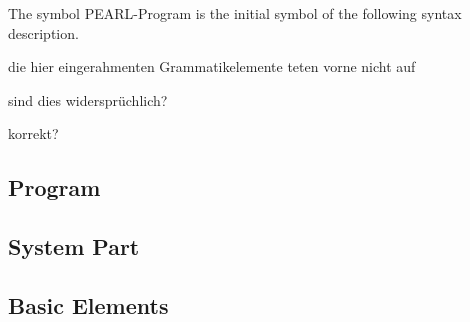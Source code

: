 The symbol PEARL-Program is the initial symbol of the following syntax
description.
\begin{discuss}
die hier eingerahmenten Grammatikelemente teten vorne nicht auf

sind dies widersprüchlich?

korrekt?
\end{discuss}
\subsection{Program}    %





\subsection{System Part}   %















\subsection{Basic Elements}    %
 





 





